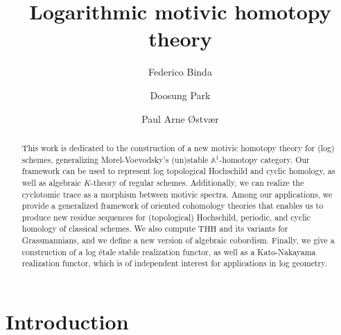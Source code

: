 \documentclass[11pt, a4paper]{amsart}
\theoremstyle{definition}
\numberwithin{equation}{subsection}
\newcommand{\THH}{\mathrm{THH}}
\begin{document}
\author{Federico Binda}
\address{Dipartimento di Matematica ``Federigo Enriques'',  
Universit\`a degli Studi di Milano, Via Cesare Saldini 50, 20133 Milano, Italy}

\author{Doosung Park}
\address{Bergische Universit{\"a}t Wuppertal,
Fakult{\"a}t Mathematik und Naturwissenschaften, Gau{\ss}strasse 20, 42119 Wuppertal, Germany}

\author{Paul Arne {\O}stv{\ae}r}
\address{Dipartimento di Matematica ``Federigo Enriques'', 
Universit\`a degli Studi di Milano, Via Cesare Saldini 50, 20133 Milano, Italy} 
\address{Department of Mathematics, University of Oslo, 
Niels Henrik Abels hus, Moltke Moes vei 35, 0851 Oslo, Norway}


\title{Logarithmic motivic homotopy theory}
\subjclass{}

\begin{abstract}
This work is dedicated to the construction of a new motivic homotopy theory for (log) schemes, generalizing Morel-Voevodsky's (un)stable $\mathbb{A}^1$-homotopy category. 
Our framework can be used to represent 
log topological Hochschild and cyclic homology, 
as well as algebraic $K$-theory of regular schemes. 
Additionally, we can realize the cyclotomic trace as a morphism between motivic spectra.
Among our applications, we provide a generalized framework of oriented cohomology theories that enables us to produce new residue sequences for (topological) Hochschild, periodic, and cyclic homology of classical schemes. We also compute $\THH$ and its variants for Grassmannians, and we define a new version of algebraic cobordism.
Finally, we give a construction of a log \'etale stable realization functor, as well as a Kato-Nakayama realization functor, which is of independent interest for applications in log geometry.
\end{abstract}

\maketitle

\setcounter{tocdepth}{1}
\tableofcontents



\section{Introduction}
\label{section:introduction}
\end{document}
